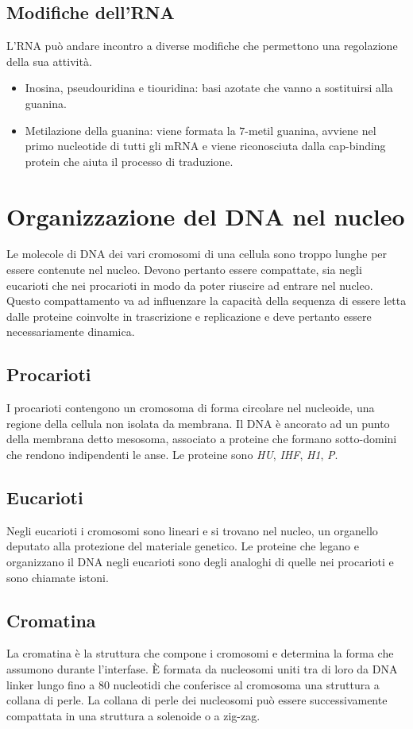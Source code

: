 \subsection{Modifiche dell'RNA}
L'RNA pu\`o andare incontro a diverse modifiche che permettono una regolazione della sua attivit\`a.
\begin{itemize}
	\item Inosina, pseudouridina e tiouridina: basi azotate che vanno a sostituirsi alla guanina.
	\item Metilazione della guanina: viene formata la $7$-metil guanina, avviene nel primo nucleotide di tutti gli mRNA e viene riconosciuta dalla cap-binding protein che aiuta il processo di traduzione.
\end{itemize}
\section{Organizzazione del DNA nel nucleo}
Le molecole di DNA dei vari cromosomi di una cellula sono troppo lunghe per essere contenute nel nucleo.
Devono pertanto essere compattate, sia negli eucarioti che nei procarioti in modo da poter riuscire ad entrare nel nucleo.
Questo compattamento va ad influenzare la capacit\`a della sequenza di essere letta dalle proteine coinvolte in trascrizione e replicazione e deve pertanto essere necessariamente dinamica.

	\subsection{Procarioti}
	I procarioti contengono un cromosoma di forma circolare nel nucleoide, una regione della cellula non isolata da membrana.
	Il DNA \`e ancorato ad un punto della membrana detto mesosoma, associato a proteine che formano sotto-domini che rendono indipendenti le anse.
	Le proteine sono \emph{HU}, \emph{IHF}, \emph{H1}, \emph{P}.

	\subsection{Eucarioti}
	Negli eucarioti i cromosomi sono lineari e si trovano nel nucleo, un organello deputato alla protezione del materiale genetico.
	Le proteine che legano e organizzano il DNA negli eucarioti sono degli analoghi di quelle nei procarioti e sono chiamate istoni.
	
	\subsection{Cromatina}
	La cromatina \`e la struttura che compone i cromosomi e determina la forma che assumono durante l'interfase.
	\`E formata da nucleosomi uniti tra di loro da DNA linker lungo fino a $80$ nucleotidi che conferisce al cromosoma una struttura a collana di perle.
	La collana di perle dei nucleosomi pu\`o essere successivamente compattata in una struttura a solenoide o a zig-zag.

